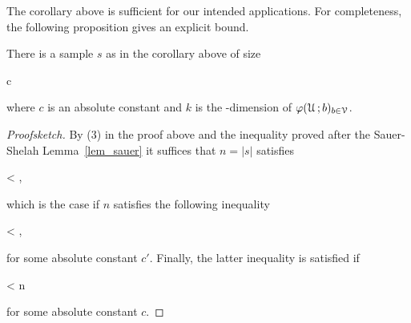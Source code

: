 \documentclass[scombinatorics.tex]{subfiles}
\begin{document}
The corollary above is sufficient for our intended applications.
For completeness, the following proposition gives an explicit bound.

\begin{proposition}\label{prop_vc_sample}
  There is a sample $s$ as in the corollary above of size
  
  {\le}
  {c\,\log{}}
  
  where $c$ is an absolute constant and $k$ is the \vc-dimension of $\varphi(\EuScript U\,;b)_{b\in\EuScript V}$.
\end{proposition}

\begin{proof}[Proofsketch]
  By (3) in the proof above and the inequality proved after the Sauer-Shelah Lemma~\ref{lem_sauer} it suffices that $n=|s|$ satisfies
  
  {<}
  {,}
  
  which is the case if $n$ satisfies the following inequality 

  {<}
  {,}

  for some absolute constant $c'$.
  Finally, the latter inequality is satisfied if 

  {<}
  {n}

  for some absolute constant $c$.
\end{proof}






\end{document}
